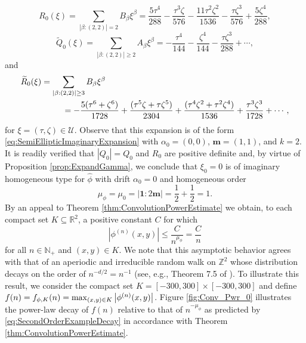 \documentclass[smallextended]{svjour3}
\theoremstyle{remark}
\newcommand{\f}[2]{\frac{#1}{#2}}
\begin{document}
\begin{example}
\begin{equation*}
R_{0}(\xi)=\sum_{|\beta:(2,2)|=2}B_\beta\xi^\beta
= \frac{5\tau^4}{288} -\f{\tau^3\zeta}{576} -\frac{11\tau^2\zeta^2}{1536}-\frac{\tau\zeta^3}{576} + \frac{5\zeta^4}{288}, 
\end{equation*}
\begin{equation*}
\widetilde{Q}_{0}(\xi)= \sum_{|\beta:(2,2)|\geq 2}A_\beta \xi^\beta= - \frac{\tau^4}{144}  - \frac{\zeta^4}{144} - \frac{\tau\zeta^3}{288} + \cdots,
\end{equation*}
and
\begin{eqnarray*}
\lefteqn{\widetilde{R}_{0}(\xi)=\sum_{|\beta:(2,2)|\geq 3}B_\beta \xi^\beta}\\
&& \hspace{1.5cm} =
-\f{5(\tau^6+\zeta^6)}{1728} + \f{(\tau^5\zeta+\tau\zeta^5)}{2304} + \frac{(\tau^4\zeta^2+\tau^2\zeta^4)}{1536} +   \frac{\tau^3\zeta^3}{1728} + \cdots,
\end{eqnarray*}
for $\xi=(\tau,\zeta)\in\mathcal{U}$. Observe that this expansion is of the form \eqref{eq:SemiEllipticImaginaryExpansion} with $\alpha_0=(0,0)$, $\mathbf{m}=(1,1)$, and $k=2$. It is readily verified that $|Q_0|=Q_0$ and $R_0$ are positive definite and, by virtue of Proposition \ref{prop:ExpandGamma}, we conclude that $\xi_0=0$ is of imaginary homogeneous type for $\widehat\phi$ with drift $\alpha_0=0$ and homogeneous order
\begin{equation*}
    \mu_{\phi}=\mu_0=|\mathbf{1}:2\mathbf{m}|=\frac{1}{2}+\frac{1}{2}=1.
\end{equation*}
By an appeal to Theorem \ref{thm:ConvolutionPowerEstimate} we obtain, to each compact set $K\subseteq\mathbb{R}^2$, a positive constant $C$ for which
\begin{equation}\label{eq:SecondOrderExampleDecay}
    |\phi^{(n)}(x,y)|\leq \frac{C}{n^{\mu_\phi}}=\frac{C}{n}
\end{equation}
for all $n\in\mathbb{N}_+$ and $(x,y)\in K$. We note that this asymptotic behavior agrees with that of an aperiodic and irreducible random walk on $\mathbb{Z}^2$ whose distribution decays on the order of $n^{-d/2}=n^{-1}$ (see, e.g., Theorem 7.5 of \cite{randles_convolution_2017}). To illustrate this result, we consider the compact set $K = [-300, 300] \times [-300, 300]$ and define $f(n)=f_{\phi,K}(n)=\max_{(x,y)\in K}\abs{\phi^{(n)}(x,y)}$. Figure \ref{fig:Conv_Pwr_0} illustrates the power-law decay of $f(n)$ relative to that of $n^{-\mu_\phi}$ as predicted by \eqref{eq:SecondOrderExampleDecay} in accordance with Theorem \ref{thm:ConvolutionPowerEstimate}.\\



\end{example}
\end{document}
